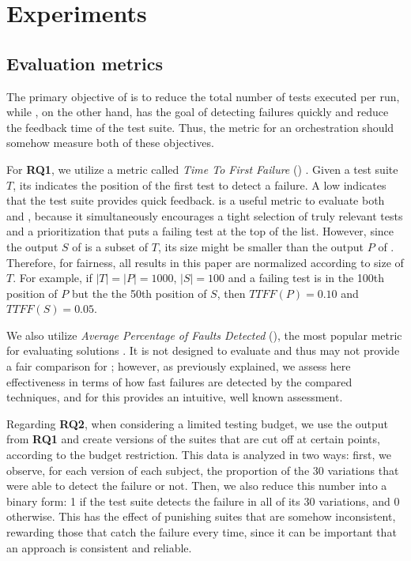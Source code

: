 \section{Experiments}\label{sec:orch_experiments}

\subsection{Evaluation metrics}
\label{subsec:metrics}

The primary objective of \tcs is to reduce the total number of tests executed per run, while \tcp, on the other hand, 
has the goal of detecting failures quickly and reduce the feedback time of the test suite.
Thus, the metric for an orchestration should somehow measure both of these objectives.

For \textbf{RQ1}, we utilize a metric called \textit{Time To First Failure} (\ttff) \cite{yoo2011faster}.
Given a test suite $T$, its \ttff indicates the position of the first test to detect a failure.
A low \ttff indicates that the test suite provides quick feedback.
\ttff is a useful metric to evaluate both \tcs and \tcp, because it simultaneously encourages a tight selection of truly relevant tests and a prioritization that puts a failing test at the top of the list.
However, since the output $S$ of \tcs is a subset of $T$, its size might be smaller than the output $P$ of \tcp.
Therefore, for fairness, all \ttff results in this paper are normalized according to size of $T$.
For example, if $|T| = |P| = 1000$, $|S| = 100$ and a failing test is in the 100th position of $P$ but the the 50th position of $S$, then $TTFF(P) = 0.10$ and $TTFF(S) = 0.05$.

We also utilize \textit{Average Percentage of Faults Detected} (\apfd), the most popular metric for evaluating \tcp solutions \cite{khatibsyarbini_test_2018}.
It is not designed to evaluate \tcs and thus may not provide a fair comparison for \ek; however, as previously explained, we assess here effectiveness in terms of how fast failures are detected by the compared techniques, and for this \apfd provides an intuitive, well known assessment.  

Regarding \textbf{RQ2}, when considering a limited testing budget, we use the output from \textbf{RQ1} and create versions of the suites that are cut off at certain points, according to the budget restriction.
This data is analyzed in two ways: first, we observe, for each version of each subject, the proportion of the 30 variations that were able to detect the failure or not.
Then, we also reduce this number into a binary form: 1 if the test suite detects the failure in all of its 30 variations, and 0 otherwise.
This has the effect of punishing suites that are somehow inconsistent, rewarding those that catch the failure every time, 
since it can be
important that an approach is consistent and reliable.


